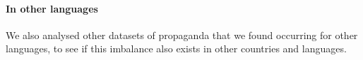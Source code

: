






\paragraph{In other languages}

We also analysed other datasets of propaganda that we found occurring for other languages, to see if this imbalance also exists in other countries and languages.



